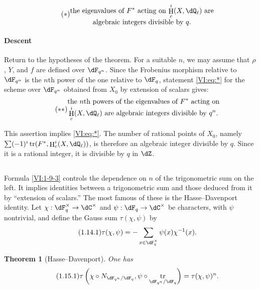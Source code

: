 \documentclass[12pt,oneside,english]{smfbook}
\DeclareMathOperator{\h}{H}
\DeclareMathOperator{\tr}{tr}
\newcounter{char}
\newtheorem{theorem_}[subsection]{Theorem}
\begin{document}
\begin{equation*}\tag{$*$}\label{VI:eq:*}
  \substack{\displaystyle\text{the eigenvalues of $F^\ast$ acting on
  $\h_c^i(X,\dQ_\ell)$ are}\\
  \displaystyle\text{algebraic integers divisible by $q$.}}
\end{equation*}

\paragraph{Descent}
Return to the hypotheses of the theorem. For a suitable $n$, we may assume that $\rho$, $Y$, and $f$ are defined over $\dF_{q^n}$. Since the Frobenius morphism relative to $\dF_{q^n}$ is the $n$th power of the one relative to $\dF_q$, statement \eqref{VI:eq:*} for the scheme over $\dF_{q^n}$ obtained from $X_0$ by extension of scalars gives:
\begin{equation*}\tag{$**$}\label{VI:eq:**}
  \substack{\displaystyle\text{the $n$th powers of the eigenvalues of
  $F^\ast$ acting on}\\
  \displaystyle\text{$\h_c^i(X,\dQ_\ell)$ are algebraic integers divisible
  by $q^n$.}}
\end{equation*}

This assertion implies \eqref{VI:eq:*}. The number of rational points of $X_0$, namely $\sum(-1)^i\tr(F^\ast,\h_c^i(X,\dQ_\ell))$, is therefore an algebraic integer divisible by $q$. Since it is a rational integer, it is divisible by $q$ in $\dZ$.

\subsection{}\label{VI:1-14}

Formula \ref{VI:1-9-3} controls the dependence on $n$ of the trigonometric sum on the left. It implies identities between a trigonometric sum and those deduced from it by ``extension of scalars.'' The most famous of these is the Hasse--Davenport identity. Let $\chi:\dF_q^\times\to\dC^\times$ and $\psi:\dF_q\to\dC^\times$ be characters, with $\psi$ nontrivial, and define the Gauss sum $\tau(\chi,\psi)$ by
\begin{equation*}\tag{1.14.1}\label{VI:eq:1-14-1}
  \tau(\chi,\psi) = - \sum_{x\in \dF_q^\times} \psi(x) \chi^{-1}(x) \text{.}
\end{equation*}

\begin{theorem_}[Hasse--Davenport]\label{VI:1-15}
One has
\begin{equation*}\tag{1.15.1}\label{VI:eq:1-15-1}
  \tau\left(\chi\circ N_{\dF_{q^n}/\dF_q},\psi\circ \tr_{\dF_{q^n}/\dF_q}\right) = \tau(\chi,\psi)^n \text{.}
\end{equation*}
\end{theorem_}
\end{document}
